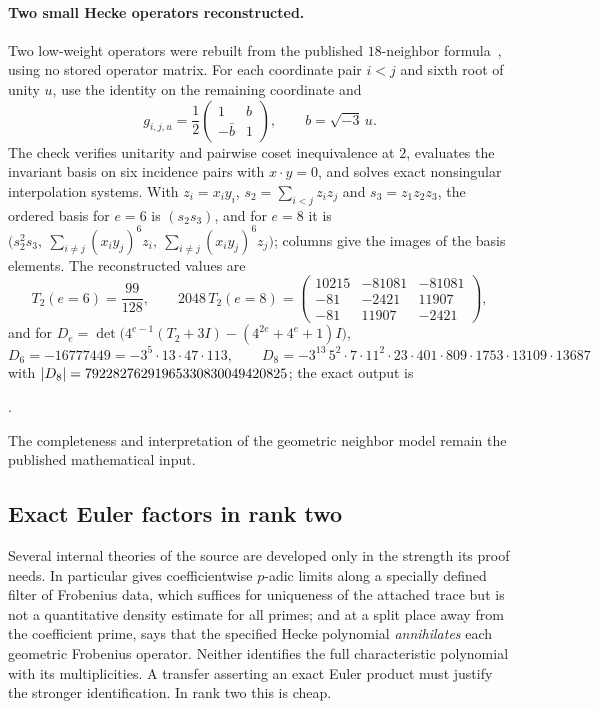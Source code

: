 \paragraph{Two small Hecke operators reconstructed.}
Two low-weight operators were rebuilt from the published $18$-neighbor
formula~\cite{Pintar2026Hecke}, using no stored operator matrix. For each
coordinate pair $i<j$ and sixth root of unity $u$, use the identity on the
remaining coordinate and
\[
 g_{i,j,u}=\frac12\begin{pmatrix}1&b\\-\bar b&1\end{pmatrix},
 \qquad b=\sqrt{-3}\,u .
\]
The check verifies unitarity and pairwise coset inequivalence at $2$,
evaluates the invariant basis on six incidence pairs with $x\cdot y=0$, and
solves exact nonsingular interpolation systems. With $z_i=x_iy_i$,
$s_2=\sum_{i<j}z_iz_j$ and $s_3=z_1z_2z_3$, the ordered basis for $e=6$ is
$(s_2s_3)$, and for $e=8$ it is
$\bigl(s_2^2s_3,\ \sum_{i\ne j}(x_iy_j)^6z_i,\ \sum_{i\ne j}(x_iy_j)^6z_j\bigr)$;
columns give the images of the basis elements. The reconstructed values are
\[
 T_2(e=6)=\frac{99}{128},\qquad
 2048\,T_2(e=8)=
 \begin{pmatrix}
 10215&-81081&-81081\\
 -81&-2421&11907\\
 -81&11907&-2421
 \end{pmatrix},
\]
and for
$D_e=\det\bigl(4^{e-1}(T_2+3I)-(4^{2e}+4^e+1)I\bigr)$,
\[
 D_6=-16777449=-3^5\cdot13\cdot47\cdot113,\qquad
 D_8=-3^{13}\,5^2\cdot7\cdot11^2\cdot23\cdot401\cdot809\cdot1753\cdot13109\cdot13687
\]
with $\lvert D_8\rvert=79228276291965330830049420825$; the exact output is
\begin{center}
.
\end{center}
The completeness and interpretation of the geometric neighbor model remain
the published mathematical input.

\subsection{Exact Euler factors in rank two}\label{sel:sec:euler}

Several internal theories of the source are developed only in the strength
its proof needs. In particular  gives
coefficientwise $p$-adic limits along a specially defined filter of
Frobenius data, which suffices for uniqueness of the attached trace but is
not a quantitative density estimate for all primes; and at a split place
away from the coefficient prime,  says that the
specified Hecke polynomial \emph{annihilates} each geometric Frobenius
operator. Neither identifies the full characteristic polynomial with its
multiplicities. A transfer asserting an exact Euler product must justify
the stronger identification. In rank two this is cheap.

